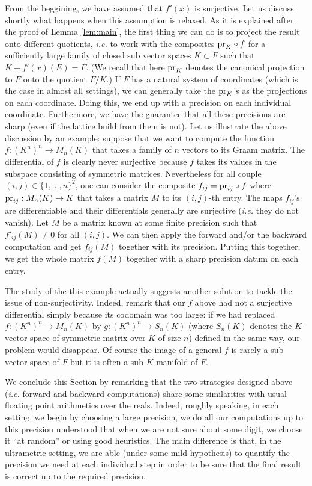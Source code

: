 \documentclass{lms}
\begin{document}
From the beggining, we have assumed that $f'(x)$ is surjective. Let us 
discuss shortly what happens when this assumption is relaxed. As it is 
explained after the proof of Lemma \ref{lem:main}, the first thing we 
can do is to project the result onto different quotients, \emph{i.e.} to 
work with the composites $\text{\rm pr}_K \circ f$ for a sufficiently large family 
of closed sub vector spaces $K \subset F$ such that $K + f'(x)(E) = F$. 
(We recall that here $\text{\rm pr}_K$ denotes the canonical projection to $F$ 
onto the quotient $F/K$.) If $F$ has a natural system of coordinates 
(which is the case in almost all settings), we can generally take the 
$\text{\rm pr}_K$'s as the projections on each coordinate. Doing this, we end up 
with a precision on each individual coordinate. Furthermore, we have the 
guarantee that all these precisions are sharp (even if the lattice build
from them is not).
Let us illustrate the above discussion by an example: suppose that we 
want to compute the function $f : (K^n)^n \to M_n(K)$ that takes a 
family of $n$ vectors to its Graam matrix. The differential of $f$ is
clearly never surjective because $f$ takes its values in the subspace
consisting of symmetric matrices. Nevertheless for all couple $(i,j)
\in \{1, \ldots, n\}^2$, one can consider the composite $f_{ij} = 
\text{\rm pr}_{ij} \circ f$ where $\text{\rm pr}_{ij} : M_n(K) \to K$ that takes a matrix 
$M$ to its $(i,j)$-th entry. The maps $f_{ij}$'s are differentiable and 
their differentials generally are surjective (\emph{i.e.} they do not 
vanish). Let $M$ be a matrix known at some finite precision such that 
$f'_{ij} (M) \neq 0$ for all $(i,j)$. We can then apply the forward 
and/or the backward computation and get $f_{ij}(M)$ together with its 
precision. Putting this together, we get the whole matrix $f(M)$ 
together with a sharp precision datum on each entry.

The study of the this example actually suggests another solution to 
tackle the issue of non-surjectivity. Indeed, remark that our $f$ above 
had not a surjective differential simply because its codomain was too 
large: if we had replaced $f : (K^n)^n \to M_n(K)$ by $g : (K^n)^n \to 
S_n(K)$ (where $S_n(K)$ denotes the $K$-vector space of symmetric matrix 
over $K$ of size $n$) defined in the same way, our problem would 
disappear. Of course the image of a general $f$ is rarely a sub vector 
space of $F$ but it is often a sub-$K$-manifold of $F$. 


\medskip

We conclude this Section by remarking that the two strategies designed 
above (\emph{i.e.} forward and backward computations) share some 
similarities with usual floating point arithmetics over the reals. 
Indeed, roughly speaking, in each setting, we begin by choosing a large 
precision, we do all our computations up to this precision understood 
that when we are not sure about some digit, we choose it ``at random'' 
or using good heuristics. The main difference is that, in the 
ultrametric setting, we are able (under some mild hypothesis) to 
quantify the precision we need at each individual step in order to be 
sure that the final result is correct up to the required precision.
\end{document}
